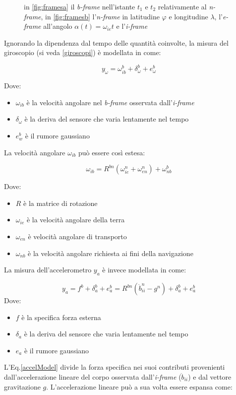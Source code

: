 \begin{figure}[H]
	\centering    
	\label{fig:frames}
	\caption{in \ref{fig:framesa} il \textit{b-frame} nell'istante $t_1$ e $t_2$ relativamente al \textit{n-frame}, in \ref{fig:framesb} l'\textit{n-frame} in latitudine $\varphi$ e longitudine $\lambda$, l'\textit{e-frame} all'angolo $\alpha(t)= \omega_{ie}t$ e l'\textit{i-frame}}
\end{figure}
Ignorando la dipendenza dal tempo delle quantità coinvolte, la misura del giroscopio (si veda \ref{giroscopi}) è modellata in \cite{gyromodel} come:

\begin{equation}
y_\omega = \omega_{ib}^b + \delta_{\omega}^b + e_\omega^b
\end{equation}

Dove:
\begin{itemize}
	\item $\omega_{ib}$ è la velocità angolare nel \textit{b-frame} osservata dall'\textit{i-frame}
	\item $\delta_\omega$ è la deriva del sensore che varia lentamente nel tempo 
	\item $e_w^b$ è il rumore gaussiano
\end{itemize}

La velocità angolare $\omega_{ib}$ può essere così estesa:

\begin{equation}
\omega_{ib} = R^{bn} ( \omega_{ie}^n + \omega_{en}^n) + \omega_{nb}^b
\end{equation}

Dove:
\begin{itemize}
	\item $ R$ è la matrice di rotazione
	\item $\omega_{ie}$ è la velocità angolare della terra
	\item $\omega_{en}$ è velocità angolare di transporto
	\item $\omega_{nb}$ è la velocità angolare richiesta ai fini della navigazione
\end{itemize}

La misura dell'accelerometro $y_a$ è invece modellata in \cite{gyromodel} come:

\begin{equation}
\label{accelModel}
 y_a = f^b + \delta_a^b + e_a^b = R^{bn} (\ddot{b}_{ii}^n - g^n) + \delta_a^b + e_a^b
\end{equation}
Dove:
\begin{itemize}
	\item $f$ è la specifica forza esterna
	\item $\delta_a$ è la deriva del sensore che varia lentamente nel tempo 
	\item $e_a$ è il rumore gaussiano
\end{itemize}
L'Eq.\ref{accelModel} divide la forza specifica nei suoi contributi provenienti dall'accelerazione lineare del corpo osservata dall'\textit{i-frame} ($\ddot{b}_{ii}$) e dal vettore gravitazione $g$. L'accelerazione lineare può a sua volta essere espansa come:

